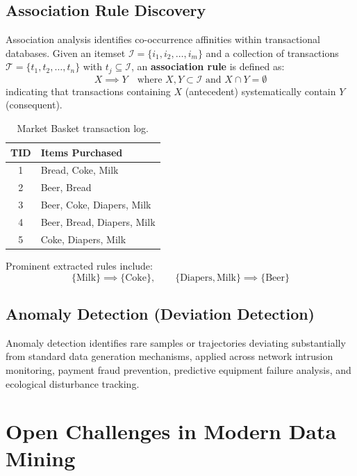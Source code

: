 \subsection{Association Rule Discovery}
Association analysis identifies co-occurrence affinities within transactional databases. Given an itemset $\mathcal{I} = \{i_1, i_2, \dots, i_m\}$ and a collection of transactions $\mathcal{T} = \{t_1, t_2, \dots, t_n\}$ with $t_j \subseteq \mathcal{I}$, an \textbf{association rule} is defined as:
\begin{equation}
    X \implies Y \quad \text{where } X, Y \subset \mathcal{I} \text{ and } X \cap Y = \emptyset
\end{equation}
indicating that transactions containing $X$ (antecedent) systematically contain $Y$ (consequent).

\begin{table}[H]
\centering
\small
\begin{tabular}{c l}
\toprule
\textbf{TID} & \textbf{Items Purchased} \\
\midrule
1 & Bread, Coke, Milk \\
2 & Beer, Bread \\
3 & Beer, Coke, Diapers, Milk \\
4 & Beer, Bread, Diapers, Milk \\
5 & Coke, Diapers, Milk \\
\bottomrule
\end{tabular}
\caption{Market Basket transaction log.}
\label{tab:market-basket-en}
\end{table}

Prominent extracted rules include:
\begin{equation}
    \{\text{Milk}\} \implies \{\text{Coke}\}, \qquad \{\text{Diapers}, \text{Milk}\} \implies \{\text{Beer}\}
\end{equation}

\subsection{Anomaly Detection (Deviation Detection)}
Anomaly detection identifies rare samples or trajectories deviating substantially from standard data generation mechanisms, applied across network intrusion monitoring, payment fraud prevention, predictive equipment failure analysis, and ecological disturbance tracking.

\FloatBarrier
\section{Open Challenges in Modern Data Mining}

